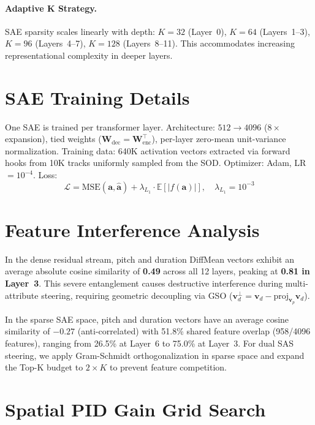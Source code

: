 \documentclass{article}
\theoremstyle{plain}
\begin{document}
\paragraph{Adaptive K Strategy.}
SAE sparsity scales linearly with depth: $K{=}32$ (Layer~0), $K{=}64$ (Layers~1--3), $K{=}96$ (Layers~4--7), $K{=}128$ (Layers~8--11). This accommodates increasing representational complexity in deeper layers.

\section{SAE Training Details}
\label{app:sae_training}

One SAE is trained per transformer layer. Architecture: $512 \to 4096$ ($8{\times}$ expansion), tied weights ($\mathbf{W}_\text{dec} = \mathbf{W}_\text{enc}^\top$), per-layer zero-mean unit-variance normalization. Training data: 640K activation vectors extracted via forward hooks from 10K tracks uniformly sampled from the SOD. Optimizer: Adam, LR $= 10^{-4}$. Loss:
\begin{equation}
    \mathcal{L} = \text{MSE}(\mathbf{a}, \hat{\mathbf{a}}) + \lambda_{L_1} \cdot \mathbb{E}[|f(\mathbf{a})|], \quad \lambda_{L_1} = 10^{-3}
\end{equation}

\section{Feature Interference Analysis}
\label{app:interference}

In the dense residual stream, pitch and duration DiffMean vectors exhibit an average absolute cosine similarity of \textbf{0.49} across all 12 layers, peaking at \textbf{0.81 in Layer~3}. This severe entanglement causes destructive interference during multi-attribute steering, requiring geometric decoupling via GSO ($\mathbf{v}^{\perp}_d = \mathbf{v}_d - \text{proj}_{\mathbf{v}_p}\mathbf{v}_d$).

In the sparse SAE space, pitch and duration vectors have an average cosine similarity of $-0.27$ (anti-correlated) with 51.8\% shared feature overlap (958/4096 features), ranging from 26.5\% at Layer~6 to 75.0\% at Layer~3. For dual SAS steering, we apply Gram-Schmidt orthogonalization in sparse space and expand the Top-K budget to $2{\times}K$ to prevent feature competition.

\section{Spatial PID Gain Grid Search}
\label{app:grid_search}
\end{document}

